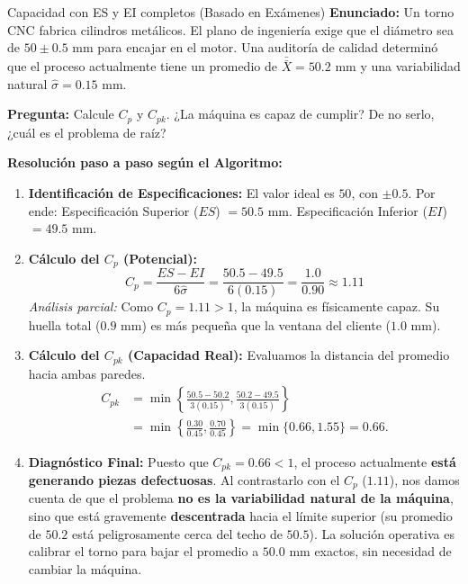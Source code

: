 \vspace{0.4cm}
\begin{ejercicio}{Capacidad con ES y EI completos (Basado en Exámenes)}
\textbf{Enunciado:} Un torno CNC fabrica cilindros metálicos. El plano de ingeniería exige que el diámetro sea de $50 \pm 0.5$ mm para encajar en el motor. Una auditoría de calidad determinó que el proceso actualmente tiene un promedio de $\bar{\bar{X}} = 50.2$ mm y una variabilidad natural $\hat{\sigma} = 0.15$ mm.

\textbf{Pregunta:} Calcule $C_p$ y $C_{pk}$. ¿La máquina es capaz de cumplir? De no serlo, ¿cuál es el problema de raíz?

\textbf{Resolución paso a paso según el Algoritmo:}
\begin{enumerate}
    \item \textbf{Identificación de Especificaciones:} 
    El valor ideal es $50$, con $\pm 0.5$. Por ende: 
    Especificación Superior ($ES$) $= 50.5$ mm.
    Especificación Inferior ($EI$) $= 49.5$ mm.
    \item \textbf{Cálculo del $C_p$ (Potencial):}
    $$ C_p = \frac{ES - EI}{6\hat{\sigma}} = \frac{50.5 - 49.5}{6(0.15)} = \frac{1.0}{0.90} \approx 1.11 $$
    \textit{Análisis parcial:} Como $C_p = 1.11 > 1$, la máquina es físicamente capaz. Su huella total ($0.9$ mm) es más pequeña que la ventana del cliente ($1.0$ mm).
    \item \textbf{Cálculo del $C_{pk}$ (Capacidad Real):} Evaluamos la distancia del promedio hacia ambas paredes.
    \begin{align*}
    C_{pk} &= \min\left\{\frac{50.5-50.2}{3(0.15)},
    \frac{50.2-49.5}{3(0.15)}\right\}\\
    &= \min\left\{\frac{0.30}{0.45},\frac{0.70}{0.45}\right\}
    = \min\{0.66,1.55\}=0.66.
    \end{align*}
    \item \textbf{Diagnóstico Final:} 
    Puesto que $C_{pk} = 0.66 < 1$, el proceso actualmente \textbf{está generando piezas defectuosas}. Al contrastarlo con el $C_p$ ($1.11$), nos damos cuenta de que el problema \textbf{no es la variabilidad natural de la máquina}, sino que está gravemente \textbf{descentrada} hacia el límite superior (su promedio de $50.2$ está peligrosamente cerca del techo de $50.5$). La solución operativa es calibrar el torno para bajar el promedio a $50.0$ mm exactos, sin necesidad de cambiar la máquina.
\end{enumerate}
\end{ejercicio}

